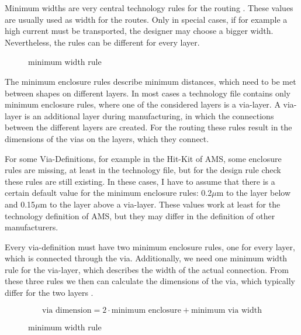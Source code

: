 Minimum widths are very central technology rules for the routing . These values are usually used as width for the routes. Only in special cases, if for example a high current must be transported, the designer may choose a bigger width. Nevertheless, the rules can be different for every layer.

\begin{figure}
	\centering
	
	\caption{minimum width rule}
	\label{fig:technology_rule_width}
\end{figure}

The minimum enclosure rules describe minimum distances, which need to be met between shapes on different layers. In most cases a technology file contains only minimum enclosure rules, where one of the considered layers is a via-layer. A via-layer is an additional layer during manufacturing, in which the connections between the different layers are created. For the routing these rules result in the dimensions of the vias on the layers, which they connect.

For some Via-Definitions, for example in the Hit-Kit of AMS, some enclosure rules are missing, at least in the technology file, but for the design rule check these rules are still existing. In these cases, I have to assume that there is a certain default value for the minimum enclosure rules: 0.2$\mu$m to the layer below and 0.15$\mu$m to the layer above a via-layer. These values work at least for the technology definition of AMS, but they may differ in the definition of other manufacturers.

Every via-definition must have two minimum enclosure rules, one for every layer, which is connected through the via. Additionally, we need one minimum width rule for the via-layer, which describes the width of the actual connection. From these three rules we then can calculate the dimensions of the via, which typically differ for the two layers .

\begin{equation}
	\label{eq:via_dimension}
	\text{via dimension} = 2 \cdot \text{minimum enclosure} + \text{minimum via width}
\end{equation}

\begin{figure}
	\centering
	
	\caption{minimum width rule}
	\label{fig:technology_rule_via_dimensions}
\end{figure}

